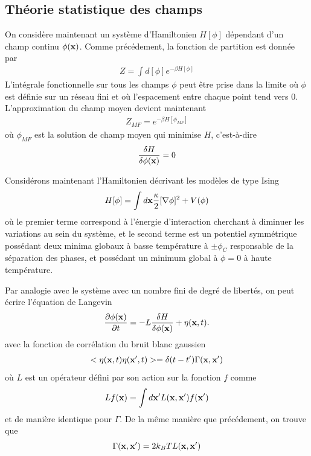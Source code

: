     \subsection{Théorie statistique des champs}

On considère maintenant un système d'Hamiltonien $H[\phi]$  dépendant d'un champ continu $\phi({\bf x})$. Comme précédement, la fonction de partition est donnée par 
\begin{align}
    Z = \int d[\phi] e^{-\beta H[\phi]}
\end{align}
L'intégrale fonctionnelle sur tous les champs $\phi$ peut être prise dans la limite où $\phi$ est définie sur un réseau fini et où l'espacement entre chaque point tend vers $0$.
L'approximation du champ moyen devient maintenant
\begin{align}
Z _{MF}=  e^{-\beta H[\phi_{MF}]}
\end{align} 
où $\phi_{MF}$ est la solution de champ moyen qui minimise $H$, c'est-à-dire 
\begin{align}
    \frac{\delta H}{\delta\phi({\bf x})} = 0
\end{align}

Considérons maintenant l'Hamiltonien décrivant les modèles de type Ising
\begin{align}
    H[\phi] = \int d {\bf x}  \frac{\kappa}{2}[\nabla \phi]^2 + V(\phi)
    \label{hamil-mean-field}
\end{align}
où le premier terme correspond à l'énergie d'interaction cherchant à diminuer les variations au sein du système, et le second terme est un potentiel symmétrique possédant deux minima globaux à basse température à $\pm \phi_C$ responsable de la séparation des phases, et possédant un minimum global à $\phi = 0$ à haute température. 

Par analogie avec le système avec un nombre fini de degré de libertés, on peut écrire l'équation de Langevin 
\begin{align}
    \frac{\partial \phi({\bf x})}{\partial t}= -L \frac{\delta H}{\delta \phi({\bf x})} + \eta({\bf x},t).
\end{align}
avec la fonction de corrélation du bruit blanc gaussien
\begin{align}
    < \eta({\bf x},t)\eta({\bf x}',t)> =\delta(t-t')\Gamma({\bf x},{\bf x}')
\end{align}
où  $L$ est un opérateur défini par son action sur la fonction $f$ comme
\begin{align}
    L f({\bf x}) = \int d{\bf x}' L({\bf x},{\bf x}')f({\bf x}')
\end{align}
et de manière identique pour $\Gamma$.
De la même manière que précédement, on trouve que 
\begin{align} 
    \Gamma({\bf x},{\bf x}') =2 k_B T L({\bf x},{\bf x}')
\end{align}


